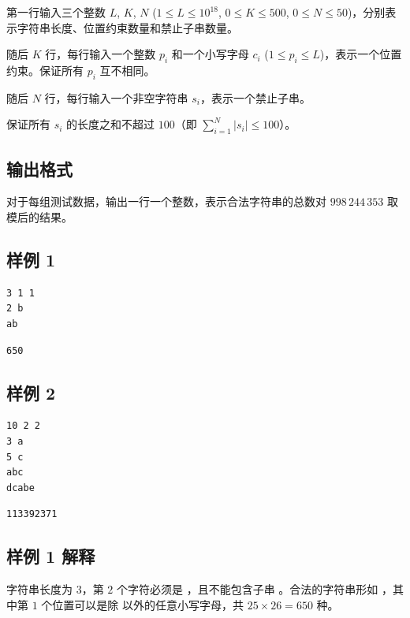 第一行输入三个整数 $L$, $K$, $N$ ($1 \le L \le 10^{18}$, $0 \le K \le 500$, $0 \le N \le 50$)，分别表示字符串长度、位置约束数量和禁止子串数量。

随后 $K$ 行，每行输入一个整数 $p_i$ 和一个小写字母 $c_i$ ($1 \le p_i \le L$)，表示一个位置约束。保证所有 $p_i$ 互不相同。

随后 $N$ 行，每行输入一个非空字符串 $s_i$，表示一个禁止子串。

保证所有 $s_i$ 的长度之和不超过 $100$（即 $\sum_{i=1}^N \vert{}s_i\vert{} \le 100$）。

\subsection{输出格式}

对于每组测试数据，输出一行一个整数，表示合法字符串的总数对 $998\,244\,353$ 取模后的结果。

\subsection{样例 1}

\begin{minipage}{\linewidth}
	\begin{minipage}[t]{0.49\linewidth}
		\begin{lstlisting}[title=\texttt{standard input}]
3 1 1
2 b
ab
\end{lstlisting}
	\end{minipage}
	\begin{minipage}[t]{0.49\linewidth}
		\begin{lstlisting}[title=\texttt{standard output}]
650
\end{lstlisting}
	\end{minipage}
\end{minipage}

\subsection{样例 2}

\begin{minipage}{\linewidth}
	\begin{minipage}[t]{0.49\linewidth}
		\begin{lstlisting}[title=\texttt{standard input}]
10 2 2
3 a
5 c
abc
dcabe
\end{lstlisting}
	\end{minipage}
	\begin{minipage}[t]{0.49\linewidth}
		\begin{lstlisting}[title=\texttt{standard output}]
113392371
\end{lstlisting}
	\end{minipage}
\end{minipage}


\subsection{样例 1 解释}

字符串长度为 $3$，第 $2$ 个字符必须是 ，且不能包含子串 。合法的字符串形如 ，其中第 $1$ 个位置可以是除  以外的任意小写字母，共 $25 \times 26 = 650$ 种。

